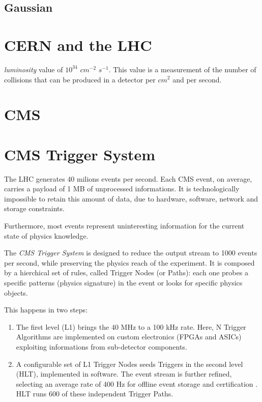 \subsection{Gaussian}

\section{CERN and the LHC}

\textit{luminosity} value of $10^{34}$ $cm^{-2}$ $s^{-1}$. This value is a measurement of the number of collisions that can be produced in a detector per $cm^2$ and per second.

\section{CMS}

\section{CMS Trigger System}


The LHC generates 40 milions events per second. Each CMS event, on average, carries a payload of 1 MB of unprocessed informations. It is technologically impossible to retain this amount of data, due to hardware, software, network and storage constraints.

Furthermore, most events represent uninteresting information for the current state of physics knowledge.

The \textit{CMS Trigger System} is designed to reduce the output stream to 1000 events per second, while preserving the physics reach of the experiment.
It is composed by a hierchical set of rules, called Trigger Nodes (or Paths): each one probes a specific patterns (physics signature) in the event or looks for specific physics objects.

This happens in two steps:

\begin{enumerate}

	\item The first level (L1) \cite{Bayatyan:706847} brings the 40 MHz to a 100 kHz rate. Here, N Trigger Algorithms are implemented on custom electronics (FPGAs and ASICs) exploiting informations from sub-detector components.

	\item A configurable set of L1 Trigger Nodes seeds Triggers in the second level (HLT), implemented in software. The event stream is further refined, selecting an average rate of 400 Hz for offline event storage and certification \cite{Khachatryan_2017}. HLT runs 600 of these independent Trigger Paths.

\end{enumerate}